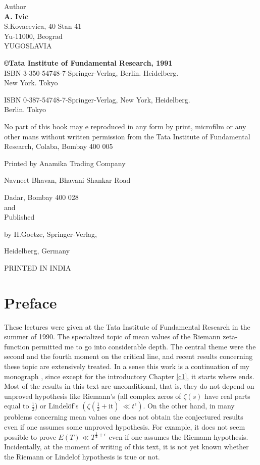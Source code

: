 \begin{center}
Author\\
{\large\bf A. Ivic}\\
S.Kovacevica, 40 Stan 41\\
Yu-11000, Beograd\\
YUGOSLAVIA
\vfill

{\bf \copyright \quad Tata Institute of Fundamental Research, 1991}\\[10pt]

ISBN 3-350-54748-7-Springer-Verlag, Berlin. Heidelberg.\\ 
New York. Tokyo
\smallskip

ISBN 0-387-54748-7-Springer-Verlag, New York, Heidelberg.\\ 
Berlin. Tokyo
\vfill


\parbox{0.7\textwidth}{No part of this book may e reproduced in any form by print, microfilm
or any other mans without written permission from the Tata Institute
of Fundamental Research, Colaba, Bombay 400 005}
\vfill

Printed by Anamika Trading Company 

Navneet Bhavan, Bhavani Shankar Road

Dadar, Bombay 400 028\\ 

and\\ 

Published

by H.Goetze, Springer-Verlag,

Heidelberg, Germany

PRINTED IN INDIA
\end{center}


\chapter{Preface}

These lectures were given at the Tata Institute of Fundamental Research
in the summer of 1990. The specialized topic of mean values of the
Riemann zeta-function permitted me to go into considerable depth. The
central theme were the second and the fourth moment on the critical
line, and recent results concerning these topic are extensively
treated. In a sense this work is a continuation of my monograph
\cite{Anderson1}, since except for the introductory Chapter \ref{c1}, it starts where
\cite{Anderson1} ends. Most of the results in this text are unconditional, that
is, they do not depend on unproved hypothesis like Riemann's (all
complex zeros of $\zeta(s)$ have real parts equal to $\frac{1}{2}$) or
Lindel\"of's $(\zeta (\frac{1}{2} + \text{it})~ \ll t^\epsilon)$. On
the other hand, in many problems concerning mean values one does not
obtain the conjectured results even if one assumes some unproved
hypothesis. For example, it does not seem possible to prove $E(T) \ll
T^{\frac{1}{4}+\epsilon}$ even if one assumes the Riemann
hypothesis. Incidentally, at the moment of writing of this text, it is
not yet known whether the Riemann or Lindelof hypothesis is true or
not.

